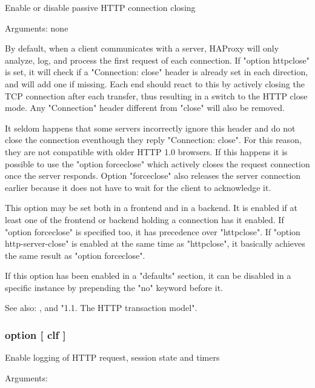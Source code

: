 {

  Enable or disable passive HTTP connection closing


  Arguments: none

  By default, when a client communicates with a server, HAProxy will only
  analyze, log, and process the first request of each connection. If "option
  httpclose" is set, it will check if a "Connection: close" header is already
  set in each direction, and will add one if missing. Each end should react to
  this by actively closing the TCP connection after each transfer, thus
  resulting in a switch to the HTTP close mode. Any "Connection" header
  different from "close" will also be removed.

  It seldom happens that some servers incorrectly ignore this header and do not
  close the connection eventhough they reply "Connection: close". For this
  reason, they are not compatible with older HTTP 1.0 browsers. If this happens
  it is possible to use the "option forceclose" which actively closes the
  request connection once the server responds. Option "forceclose" also
  releases the server connection earlier because it does not have to wait for
  the client to acknowledge it.

  This option may be set both in a frontend and in a backend. It is enabled if
  at least one of the frontend or backend holding a connection has it enabled.
  If "option forceclose" is specified too, it has precedence over "httpclose".
  If "option http-server-close" is enabled at the same time as "httpclose", it
  basically achieves the same result as "option forceclose".

  If this option has been enabled in a "defaults" section, it can be disabled
  in a specific instance by prepending the "no" keyword before it.

  See also: ,  and
             "1.1. The HTTP transaction model".

\subsubsection[httplog]{option  [ clf ]}

  Enable logging of HTTP request, session state and timers


  Arguments:
  
}
